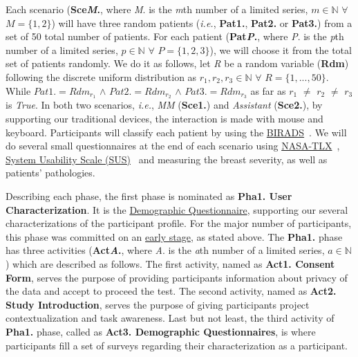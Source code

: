 Each scenario (\textbf{Sce\textit{M}.}, where \textit{M}. is the \textit{m}th number of a limited series, $m \in \mathbb{N}$ $\forall$ $M = \{1, 2\}$) will have three random patients (\textit{i.e.}, \textbf{Pat1.}, \textbf{Pat2.} or \textbf{Pat3.}) from a set of 50 total number of patients. For each patient (\textbf{Pat\textit{P}.}, where \textit{P}. is the \textit{p}th number of a limited series, $p \in \mathbb{N}$ $\forall$ $P = \{1, 2, 3\}$), we will choose it from the total set of patients randomly. We do it as follows, let \textit{R} be a random variable (\textbf{Rdm}) following the discrete uniform distribution as $r_{1}, r_{2}, r_{3} \in \mathbb{N}$ $\forall$ $R = \{1, ..., 50\}$. While $Pat1. = Rdm_{r_{1}}$ $\wedge$ $Pat2. = Rdm_{r_{2}}$ $\wedge$ $Pat3. = Rdm_{r_{3}}$ as far as $r_{1}$ $\neq$ $r_{2}$ $\neq$ $r_{3}$ is \textit{True}. In both two scenarios, \textit{i.e.}, {\it \gls{MM}} (\textbf{Sce1.}) and \textit{Assistant} (\textbf{Sce2.}), by supporting our traditional devices, the interaction is made with mouse and keyboard. Participants will classify each patient by using the \hyperlink{https://en.wikipedia.org/wiki/BI-RADS}{BIRADS}~\cite{balleyguier2007birads}. We will do several small questionnaires at the end of each scenario using \hyperlink{https://en.wikipedia.org/wiki/NASA-TLX}{NASA-TLX}~\cite{ramkumar2017using}, \hyperlink{https://en.wikipedia.org/wiki/System_usability_scale}{System Usability Scale (SUS)}~\cite{orfanou2015perceived} and measuring the breast severity, as well as patients' pathologies.

Describing each phase, the first phase is nominated as \textbf{Pha1. User Characterization}. It is the \hyperlink{https://docs.google.com/spreadsheets/d/1h-4neEo3RbYsJs3JHBGvogHCvz3UFnMvsmoernfCuDU/edit?usp=sharing}{Demographic Questionnaire}, supporting our several characterizations of the participant profile. For the major number of participants, this phase was committed on an \hyperlink{https://github.com/MIMBCD-UI/testing-guide-breast/tree/master/samples/test_4}{early stage}, as stated above. The \textbf{Pha1.} phase has three activities (\textbf{Act\textit{A}.}, where \textit{A}. is the \textit{a}th number of a limited series, $a \in \mathbb{N}$) which are described as follows. The first activity, named as \textbf{Act1. Consent Form}, serves the purpose of providing participants information about privacy of the data and accept to proceed the test. The second activity, named as \textbf{Act2. Study Introduction}, serves the purpose of giving participants project contextualization and task awareness. Last but not least, the third activity of \textbf{Pha1.} phase, called as \textbf{Act3. Demographic Questionnaires}, is where participants fill a set of surveys regarding their characterization as a participant.

